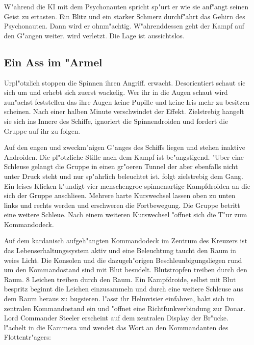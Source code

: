 
W"ahrend die KI mit dem Psychonauten spricht sp"urt er wie sie anf"angt seinen Geist zu ertasten. Ein Blitz und ein starker Schmerz durchf"ahrt das Gehirn des Psychonauten. Dann wird er ohnm"achtig. W"ahrenddessen geht der Kampf auf den G"angen weiter. \ml{} wird verletzt. Die Lage ist aussichtslos.

\subsection{Ein Ass im "Armel}
Urpl"otzlich stoppen die Spinnen ihren Angriff. \xl{} erwacht. Desorientiert schaut sie sich um und erhebt sich zuerst wackelig. Wer ihr in die Augen schaut wird zun"achst feststellen das ihre Augen keine Pupille und keine Iris mehr zu besitzen scheinen. Nach einer halben Minute verschwindet der Effekt. Zielstrebig hangelt sie sich ins Innere des Schiffe, ignoriert die Spinnendroiden und fordert die Gruppe auf ihr zu folgen.


Auf den engen und zweckm"a\3igen G"anges des Schiffs liegen und stehen inaktive Androiden. Die pl"otzliche Stille nach dem Kampf ist be"angstigend. "Uber eine Schleuse gelangt die Gruppe in einen gr"o\3eren Tunnel der aber ebenfalls nicht unter Druck steht und nur sp"ahrlich beleuchtet ist. \xl{} folgt zielstrebig dem Gang. Ein leises Klicken k"undigt vier menschengro\3e spinnenartige Kampfdroiden an die sich der Gruppe anschlie\3en. Mehrere harte Kurswechsel lassen oben zu unten links und rechts werden und erschweren die Fortbewegung. 
Die Gruppe betritt eine weitere Schleu\3e. Nach einem weiteren Kurswechsel "offnet sich die T"ur zum Kommandodeck.

Auf dem kardanisch aufgeh"angten Kommandodeck im Zentrum des Kreuzers ist das Lebenserhaltungssystem aktiv und eine Beleuchtung taucht den Raum in wei\3es Licht. Die Konsolen und die dazugeh"origen Beschleunbigungsliegen rund um den Kommandostand sind mit Blut besudelt. Blutstropfen treiben durch den Raum. 8 Leichen treiben durch den Raum. Ein Kampfdroide, selbst mit Blut bespritz beginnt die Leichen einzusammeln und durch eine weitere Schleuse aus dem Raum heraus zu bugsieren. \xl{} l"asst ihr Helmvisier einfahren, hakt sich im zentralen Kommandostand ein und "offnet eine Richtfunkverbindung zur Donar. Lord Commander Steeler erscheint auf dem zentralen Display der Br"ucke. \xl{} l"achelt in die Kammera und wendet das Wort an den Kommandanten des Flottentr"agers:

